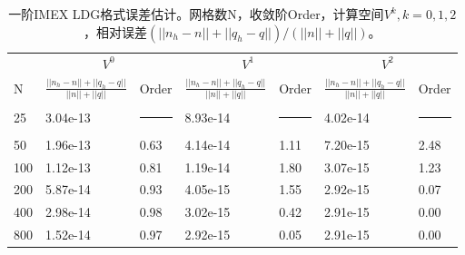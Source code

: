 \begin{table}
	\begin{tabularx}{\textwidth}{@{} *7{X} @{}}
		\toprule
		    & \multicolumn{2}{c}{$V^0$}                 & \multicolumn{2}{c}{$V^1$} & \multicolumn{2}{c}{$V^2$}                                                                                                       \\
		\cmidrule(lr){2-3} \cmidrule(lr){4-5} \cmidrule(lr){6-7}
		N   & $\frac{||n_h-n||+||q_h-q||}{||n||+||q||}$ & Order                     & $\frac{||n_h-n||+||q_h-q||}{||n||+||q||}$ & Order              & $\frac{||n_h-n||+||q_h-q||}{||n||+||q||}$ & Order              \\
		\midrule
		25  & 3.04e-13                                  & \rule{\len}{0.4pt}        & 8.93e-14                                  & \rule{\len}{0.4pt} & 4.02e-14                                  & \rule{\len}{0.4pt} \\
		50  & 1.96e-13                                  & 0.63                      & 4.14e-14                                  & 1.11               & 7.20e-15                                  & 2.48               \\
		100 & 1.12e-13                                  & 0.81                      & 1.19e-14                                  & 1.80               & 3.07e-15                                  & 1.23               \\
		200 & 5.87e-14                                  & 0.93                      & 4.05e-15                                  & 1.55               & 2.92e-15                                  & 0.07               \\
		400 & 2.98e-14                                  & 0.98                      & 3.02e-15                                  & 0.42               & 2.91e-15                                  & 0.00               \\
		800 & 1.52e-14                                  & 0.97                      & 2.92e-15                                  & 0.05               & 2.91e-15                                  & 0.00               \\
		\bottomrule
	\end{tabularx}
	\caption{一阶IMEX LDG格式误差估计。网格数N，收敛阶Order，计算空间$V^k, k=0,1,2$，相对误差$(||n_h-n||+||q_h-q||)/(||n||+||q||)$。}
	\label{tab:IMEXLDGerror:1}
\end{table}
